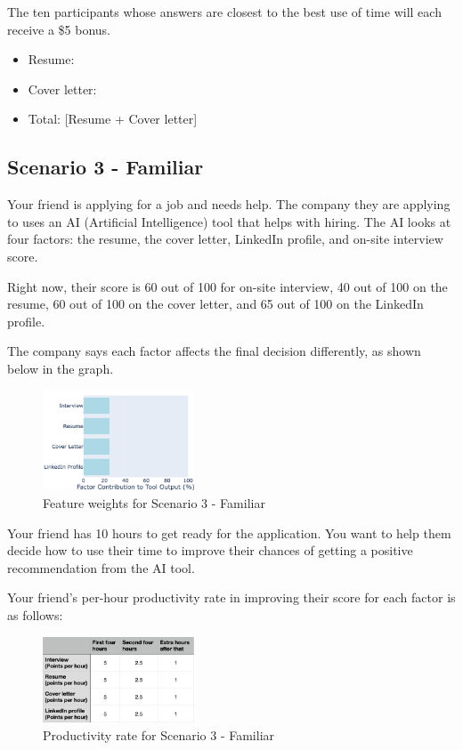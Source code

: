 The ten participants whose answers are closest to the best use of time will each receive a \$5 bonus.

\begin{itemize}
    \item Resume: \underline{\hspace{3cm}}
    \item Cover letter: \underline{\hspace{3cm}}
    \item Total: [Resume + Cover letter]
\end{itemize}


\subsection{Scenario 3 - Familiar}
Your friend is applying for a job and needs help. The company they are applying to uses an AI (Artificial Intelligence) tool that helps with hiring. The AI looks at four factors: the resume, the cover letter, LinkedIn profile, and on-site interview score.

Right now, their score is 60 out of 100 for on-site interview, 40 out of 100 on the resume, 60 out of 100 on the cover letter, and 65 out of 100 on the LinkedIn profile.

The company says each factor affects the final decision differently, as shown below in the graph.
\begin{figure}[ht]
    \centering
    \includegraphics[width=0.4\textwidth]{Figures/4-equal.png}
    \caption{Feature weights for Scenario 3 - Familiar}
    \label{fig:survey-weights-scenario3}
\end{figure}

Your friend has 10 hours to get ready for the application. You want to help them decide how to use their time to improve their chances of getting a positive recommendation from the AI tool.

Your friend’s per-hour productivity rate in improving their score for each factor is as follows:
\begin{figure}[ht]
    \centering
    \includegraphics[width=0.4\textwidth]{Figures/cost-four.png}
    \caption{Productivity rate for Scenario 3 - Familiar}
    \label{fig:survey-cost-scenario3}
\end{figure}

